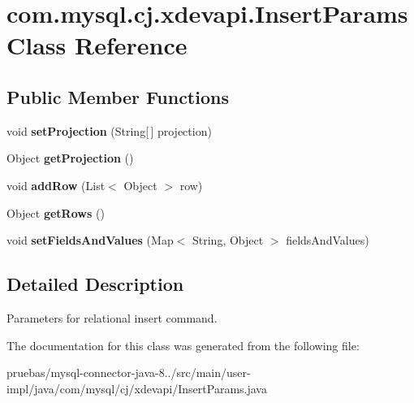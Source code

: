\hypertarget{classcom_1_1mysql_1_1cj_1_1xdevapi_1_1_insert_params}{}\section{com.\+mysql.\+cj.\+xdevapi.\+Insert\+Params Class Reference}
\label{classcom_1_1mysql_1_1cj_1_1xdevapi_1_1_insert_params}
\subsection*{Public Member Functions}
\begin{DoxyCompactItemize}
\item 
\mbox{\label{classcom_1_1mysql_1_1cj_1_1xdevapi_1_1_insert_params_a24fc565a32e226e50102e0acceaedad1}} 
void {\bfseries set\+Projection} (String\mbox{[}$\,$\mbox{]} projection)
\item 
\mbox{\label{classcom_1_1mysql_1_1cj_1_1xdevapi_1_1_insert_params_a3f31119dfb7d04ca211c9061da25c048}} 
Object {\bfseries get\+Projection} ()
\item 
\mbox{\label{classcom_1_1mysql_1_1cj_1_1xdevapi_1_1_insert_params_adc7aa4d7c347cfdee2f2bb4d8d7efdec}} 
void {\bfseries add\+Row} (List$<$ Object $>$ row)
\item 
\mbox{\label{classcom_1_1mysql_1_1cj_1_1xdevapi_1_1_insert_params_a920e6a772e6d424caa6174bf249dba13}} 
Object {\bfseries get\+Rows} ()
\item 
\mbox{\label{classcom_1_1mysql_1_1cj_1_1xdevapi_1_1_insert_params_a439b23f0d008f44cbd1c50bba01f707c}} 
void {\bfseries set\+Fields\+And\+Values} (Map$<$ String, Object $>$ fields\+And\+Values)
\end{DoxyCompactItemize}


\subsection{Detailed Description}
Parameters for relational insert command. 

The documentation for this class was generated from the following file\+:\begin{DoxyCompactItemize}
\item 
pruebas/mysql-\/connector-\/java-\/8../src/main/user-\/impl/java/com/mysql/cj/xdevapi/Insert\+Params.\+java\end{DoxyCompactItemize}
